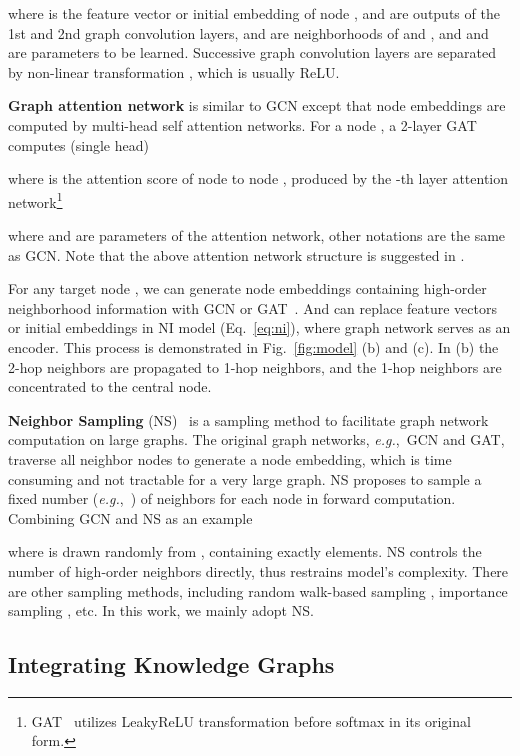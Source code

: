 \documentclass[sigconf]{acmart}
\newcommand{\eg}{\emph{e.g.},~}
\begin{document}
where  is the feature vector or initial embedding of node ,  and  are outputs of the 1st and 2nd graph convolution layers,  and  are neighborhoods of  and , and  and  are parameters to be learned. Successive graph convolution layers are separated by non-linear transformation , which is usually ReLU.

\textbf{Graph attention network} is similar to GCN except that node embeddings are computed by multi-head self attention networks. For a node , a 2-layer GAT computes (single head)

where  is the attention score of node  to node , produced by the -th layer attention network\footnote{GAT~\cite{velickovic2017graph} utilizes LeakyReLU transformation before softmax in its original form.}

where  and  are parameters of the attention network, other notations are the same as GCN. Note that the above attention network structure is suggested in \cite{velickovic2017graph}.

For any target node , we can generate node embeddings  containing high-order neighborhood information with GCN or GAT~\cite{kipf2016semi,velickovic2017graph}. And  can replace feature vectors or initial embeddings in NI model (Eq.~\eqref{eq:ni}), where graph network serves as an encoder. This process is demonstrated in Fig.~\ref{fig:model} (b) and (c). In (b) the 2-hop neighbors are propagated to 1-hop neighbors, and the 1-hop neighbors are concentrated to the central node.

\textbf{Neighbor Sampling} (NS)~\cite{hamilton2017inductive} is a sampling method to facilitate graph network computation on large graphs. 
The original graph networks, \eg GCN and GAT, traverse all neighbor nodes to generate a node embedding, which is time consuming and not tractable for a very large graph. 
NS proposes to sample a fixed number (\eg ) of neighbors for each node in forward computation. Combining GCN and NS as an example

where  is drawn randomly from , containing exactly  elements. NS controls the number of high-order neighbors directly, thus restrains model's complexity.
There are other sampling methods, including random walk-based sampling \cite{ying2018graph}, importance sampling \cite{chen2018fastgcn}, etc. In this work, we mainly adopt NS.

\subsection{Integrating Knowledge Graphs}\label{sec:kig}
\end{document}
